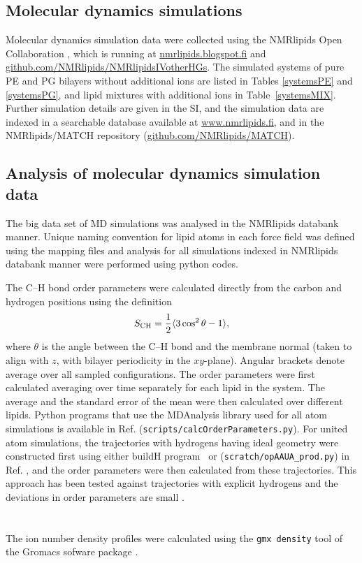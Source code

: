 \documentclass[aps,prl,superscriptaddress,twocolumn]{revtex4}
\begin{document}
\subsection{Molecular dynamics simulations}

Molecular dynamics simulation data were collected using
the NMRlipids Open Collaboration \cite{botan15}, which is running at
\url{nmrlipids.blogspot.fi} and \url{github.com/NMRlipids/NMRlipidsIVotherHGs}.
The simulated systems of pure PE and PG bilayers without additional ions
are listed in Tables \ref{systemsPE} and \ref{systemsPG},
and lipid mixtures with additional ions in Table~\ref{systemsMIX}.
Further simulation details are given in the SI, and
the simulation data are indexed in a
searchable database available at \url{www.nmrlipids.fi},
and in the NMRlipids/MATCH repository (\url{github.com/NMRlipids/MATCH}).

\subsection{Analysis of molecular dynamics simulation data}
The big data set of MD simulations was analysed in the NMRlipids databank manner.
Unique naming convention for lipid atoms in each force field was defined using the mapping files
and analysis for all simulations indexed in NMRlipids databank manner were performed
using python codes.

The C--H bond order parameters were calculated directly
from the carbon and hydrogen positions using the definition
\begin{equation}
S_{\rm CH}=\frac{1}{2}\langle 3\cos^2\theta -1 \rangle,
\end{equation}
where $\theta$ is the angle between the C--H bond and the membrane normal
(taken to align with $z$, with bilayer periodicity in the $xy$-plane).
Angular brackets denote average over all sampled configurations.
The order parameters were first calculated averaging over time separately
for each lipid in the system. The average and
the standard error of the mean were then calculated over different lipids.
Python programs that use the MDAnalysis library \cite{agrawal11,gowers16}
used for all atom simulations is available in Ref. 
({\tt scripts/calcOrderParameters.py}). For united atom simulations, the trajectories
with hydrogens having ideal geometry were constructed first using either buildH program~\cite{buildH}
or ({\tt scratch/opAAUA\_prod.py}) in  Ref. , and the order parameters were
then calculated from these trajectories. This approach has been tested against trajectories
with explicit hydrogens and the deviations in order parameters are small \cite{buildH,piggot17}.\\
\\
\\
The ion number density profiles were calculated using the {\tt gmx density} tool
of the Gromacs sofware package \cite{gromacsMANUAL}.
\end{document}
